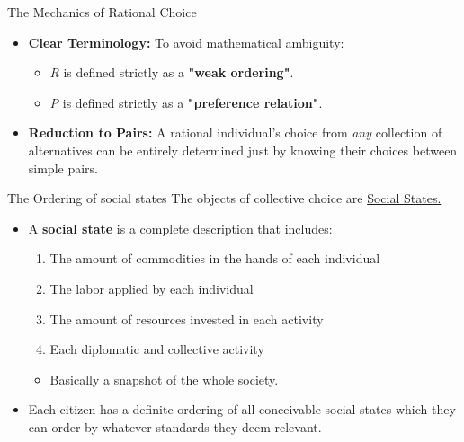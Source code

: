 \documentclass{beamer}
\begin{document}
\begin{frame}{The Mechanics of Rational Choice}
    \begin{itemize}
        \item \textbf{Clear Terminology:} To avoid mathematical ambiguity:
        \begin{itemize}
            \item \textit{R} is defined strictly as a \textbf{"weak ordering"}.
            \item \textit{P} is defined strictly as a \textbf{"preference relation"}.
        \end{itemize}
        \vspace{0.5 cm}
        \item \textbf{Reduction to Pairs:} A rational individual's choice from \textit{any} collection of alternatives can be entirely determined just by knowing their choices between simple pairs.
    \end{itemize}
\end{frame}

\begin{frame}{The Ordering of social states}
    The objects of  collective choice are \underline{Social States.}
    \begin{itemize}
        \vspace{0.5 cm}
        \item A \textbf{social state} is a complete description that includes: 
        \begin{enumerate}
            \item The amount of commodities in the hands of each individual
            \item The labor applied by each individual
            \item The amount of resources invested in each activity
            \item Each diplomatic and collective activity
        \end{enumerate}
        \begin{itemize}
            \item[$\Rightarrow$] Basically a snapshot of the whole society.
        \end{itemize}
        \item Each citizen has a definite ordering of all conceivable social states which they can order by whatever standards they deem relevant.
    \end{itemize}
    
\end{frame}
\end{document}
